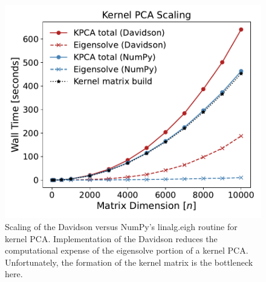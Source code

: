 \documentclass[12pt, fleqn]{article}
\begin{document}
\begin{figure}[ht]
\centering
\includegraphics[width=\textwidth]{./figures/kpca_scaling.pdf}
\caption{
Scaling of the Davidson versus NumPy's linalg.eigh routine for kernel PCA. 
Implementation of the Davidson reduces the computational expense of the eigensolve portion of a kernel PCA.
Unfortunately, the formation of the kernel matrix is the bottleneck here.
}
\label{fig:kpca-scaling}
\end{figure}



\newpage


\end{document}
